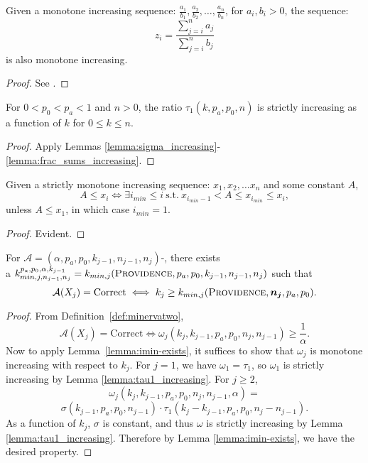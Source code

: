 \begin{lemma}
    \label{lemma:frac_sums_increasing}
    Given a monotone increasing sequence: $\frac{a_1}{b_1}, \frac{a_2}{b_2}, \ldots, \frac{a_n}{b_n}$, for $a_i, b_i > 0$, the sequence:
    $$z_i = \frac{\sum_{j=i}^n a_j}{\sum_{j=i}^n b_j}$$
    is also monotone increasing.
\end{lemma}

\begin{proof}
See \cite[Lemma 2]{usenix_minerva}. 
\end{proof}

\begin{lemma}
    \label{lemma:tau1_increasing}
For $0<p_0< p_a< 1$ and $n>0$, the ratio $\tau_1(k,p_a,p_0,n)$ is strictly increasing as a function of $k$ for $0\le k\le n$.
\end{lemma}
\begin{proof}
    Apply Lemmas \ref{lemma:sigma_increasing}-\ref{lemma:frac_sums_increasing}.
\end{proof}
\begin{lemma}
    \label{lemma:imin-exists}
    Given a strictly monotone increasing sequence: $x_1, x_2, \ldots x_n $ and some constant $A$,
    $$A \le x_i \Leftrightarrow \exists i_{min} \le i ~\text{s.t.}~   x_{i_{min} -1} < A \le x_{i_{min}} \le x_{i},$$
    unless $A\le x_1$, in which case $i_{min} =1 $.
\end{lemma}
\begin{proof}
    Evident.
\end{proof}

\begin{lemma}
    \label{lemma:minerva2_kmin_exists}
    For $\mathcal{A}=(\alpha,p_a, p_0,k_{j-1},n_{j-1},n_j)$-\Providence, there exists\\ a 
    $k^{p_a, p_0, \alpha, k_{j-1}}_{min, j, n_{j-1}, n_j}  = 
    k_{min,j}(\textsc{Providence}, p_a, p_0, k_{j-1}, n_{j-1}, n_j)$ such that $$\mathcal{A}(X_j)=\text{Correct}\iff k_j\ge k_{min,j}(\textsc{Providence},  \bm{n_j}, p_a, p_0).$$
\end{lemma}
\begin{proof}
    From Definition~\ref{def:minervatwo}, $$\mathcal{A}(X_j)=\text{Correct}\iff \omega_j(k_{j}, k_{j-1}, p_a, p_0, n_j, n_{j-1}) \ge \frac{1}{\alpha}.$$
    Now to apply Lemma~\ref{lemma:imin-exists}, it suffices to show that
    $\omega_j$ is monotone increasing with respect to $k_j$.
    For $j=1$, we have $\omega_1=\tau_1$, so $\omega_1$ is strictly increasing by Lemma \ref{lemma:tau1_increasing}. For $j\ge 2$,
    $$\omega_j(k_j,k_{j-1},p_a,p_0,n_j,n_{j-1},\alpha)=$$$$\sigma(k_{j-1},p_a,p_0,n_{j-1})\cdot \tau_1(k_{j}-k_{j-1},p_a,p_0,n_j-n_{j-1}).$$
    As a function of $k_j$, $\sigma$ is constant, and thus $\omega$ is strictly increasing by Lemma \ref{lemma:tau1_increasing}. Therefore by Lemma \ref{lemma:imin-exists}, we have the desired property.
\end{proof}

